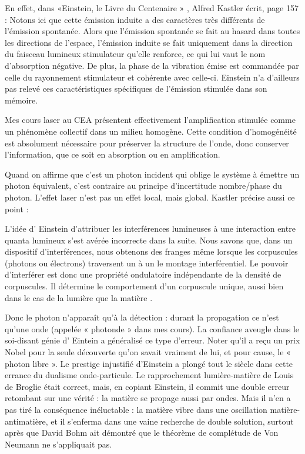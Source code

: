 \documentclass[a4paper,12pt]{article}
\begin{document}
En effet, dans «Einstein, le Livre du Centenaire » \cite{French}, Alfred Kastler écrit, page 157 : Notons ici que cette émission induite a des caractères très différents de l'émission spontanée. Alors que l'émission spontanée se fait au hasard dans toutes les directions de l'espace, l'émission induite se fait uniquement dans la direction du faisceau lumineux stimulateur qu'elle renforce, ce qui lui vaut le nom d'absorption négative. De plus, la phase de la vibration émise est commandée par celle du rayonnement stimulateur et cohérente avec celle-ci. Einstein n'a d'ailleurs pas relevé ces caractéristiques spécifiques de l'émission stimulée dans son mémoire.

Mes cours laser au CEA présentent effectivement l'amplification stimulée comme un phénomène collectif dans un milieu homogène. Cette condition d'homogénéité est absolument nécessaire pour préserver la structure de l'onde, donc conserver l'information, que ce soit en absorption ou en amplification.

Quand on affirme que c'est un photon incident qui oblige le système à émettre un photon équivalent, c'est contraire au principe d'incertitude nombre/phase du photon. L'effet laser n'est pas un effet local, mais global. Kastler précise aussi ce point :

L'idée d' Einstein d'attribuer les interférences lumineuses à une interaction entre quanta lumineux s'est avérée incorrecte dans la suite. Nous savons que, dans un dispositif d'interférences, nous obtenons des franges même lorsque les corpuscules (photons ou électrons) traversent un à un le montage interférentiel. Le pouvoir d'interférer est donc une propriété ondulatoire indépendante de la densité de corpuscules. Il détermine le comportement d'un corpuscule unique, aussi bien dans le cas de la lumière que la matière .

Donc le photon n'apparaît qu'à la détection : durant la propagation ce n'est qu'une onde (appelée « photonde » dans mes cours). La confiance aveugle dans le soi-disant génie d' Eintein a généralisé ce type d'erreur. Noter qu'il a reçu un prix Nobel pour la seule découverte qu'on savait vraiment de lui, et pour cause, le « photon libre ». Le prestige injustifié d'Einstein a plongé tout le siècle dans cette errance du dualisme onde-particule. Le rapprochement lumière-matière de Louis de Broglie était correct, mais, en copiant Einstein, il commit une double erreur retombant sur une vérité : la matière se propage aussi par ondes. Mais il n'en a pas tiré la conséquence inéluctable : la matière vibre dans une oscillation matière-antimatière, et il s'enferma dans une vaine recherche de double solution, surtout après que David Bohm ait démontré que le théorème de complétude de Von Neumann ne s'appliquait pas.
\end{document}
